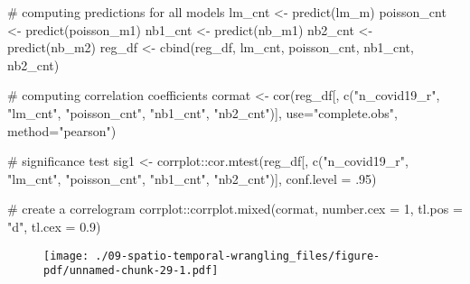 \documentclass[
  letterpaper,
  krantz2]{style/krantz}
\newenvironment{Shaded}{\begin{snugshade}}{\end{snugshade}}
\newcommand{\AttributeTok}[1]{\textcolor[rgb]{0.40,0.45,0.13}{#1}}
\newcommand{\CommentTok}[1]{\textcolor[rgb]{0.37,0.37,0.37}{#1}}
\newcommand{\DecValTok}[1]{\textcolor[rgb]{0.68,0.00,0.00}{#1}}
\newcommand{\FloatTok}[1]{\textcolor[rgb]{0.68,0.00,0.00}{#1}}
\newcommand{\FunctionTok}[1]{\textcolor[rgb]{0.28,0.35,0.67}{#1}}
\newcommand{\NormalTok}[1]{\textcolor[rgb]{0.00,0.23,0.31}{#1}}
\newcommand{\OtherTok}[1]{\textcolor[rgb]{0.00,0.23,0.31}{#1}}
\newcommand{\SpecialCharTok}[1]{\textcolor[rgb]{0.37,0.37,0.37}{#1}}
\newcommand{\StringTok}[1]{\textcolor[rgb]{0.13,0.47,0.30}{#1}}
\begin{document}
\begin{Shaded}
\begin{Highlighting}[]
\CommentTok{\# computing predictions for all models}
\NormalTok{lm\_cnt }\OtherTok{\textless{}{-}} \FunctionTok{predict}\NormalTok{(lm\_m)}
\NormalTok{poisson\_cnt }\OtherTok{\textless{}{-}} \FunctionTok{predict}\NormalTok{(poisson\_m1)}
\NormalTok{nb1\_cnt }\OtherTok{\textless{}{-}} \FunctionTok{predict}\NormalTok{(nb\_m1)}
\NormalTok{nb2\_cnt }\OtherTok{\textless{}{-}} \FunctionTok{predict}\NormalTok{(nb\_m2)}
\NormalTok{reg\_df }\OtherTok{\textless{}{-}} \FunctionTok{cbind}\NormalTok{(reg\_df, lm\_cnt, poisson\_cnt, nb1\_cnt, nb2\_cnt)}

\CommentTok{\# computing correlation coefficients}
\NormalTok{cormat }\OtherTok{\textless{}{-}} \FunctionTok{cor}\NormalTok{(reg\_df[, }\FunctionTok{c}\NormalTok{(}\StringTok{"n\_covid19\_r"}\NormalTok{, }\StringTok{"lm\_cnt"}\NormalTok{, }\StringTok{"poisson\_cnt"}\NormalTok{, }\StringTok{"nb1\_cnt"}\NormalTok{, }\StringTok{"nb2\_cnt"}\NormalTok{)], }
              \AttributeTok{use=}\StringTok{"complete.obs"}\NormalTok{, }
              \AttributeTok{method=}\StringTok{"pearson"}\NormalTok{)}

\CommentTok{\# significance test}
\NormalTok{sig1 }\OtherTok{\textless{}{-}}\NormalTok{ corrplot}\SpecialCharTok{::}\FunctionTok{cor.mtest}\NormalTok{(reg\_df[, }\FunctionTok{c}\NormalTok{(}\StringTok{"n\_covid19\_r"}\NormalTok{, }\StringTok{"lm\_cnt"}\NormalTok{, }\StringTok{"poisson\_cnt"}\NormalTok{, }\StringTok{"nb1\_cnt"}\NormalTok{, }\StringTok{"nb2\_cnt"}\NormalTok{)],}
                            \AttributeTok{conf.level =}\NormalTok{ .}\DecValTok{95}\NormalTok{)}

\CommentTok{\# create a correlogram}
\NormalTok{corrplot}\SpecialCharTok{::}\FunctionTok{corrplot.mixed}\NormalTok{(cormat,}
                         \AttributeTok{number.cex =} \DecValTok{1}\NormalTok{,}
                         \AttributeTok{tl.pos =} \StringTok{"d"}\NormalTok{,}
                         \AttributeTok{tl.cex =} \FloatTok{0.9}\NormalTok{)}
\end{Highlighting}
\end{Shaded}

\begin{figure}[H]

{\centering \texttt{[image: ./09-spatio-temporal-wrangling\_files/figure-pdf/unnamed-chunk-29-1.pdf]}

}

\end{figure}
\end{document}
